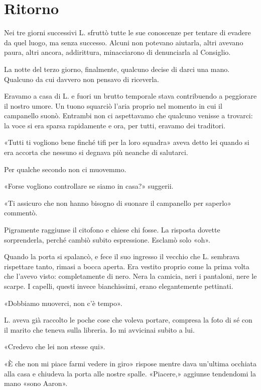 \chapter{Ritorno}
\label{ch:ritorno}

Nei tre giorni successivi L. sfruttò tutte le sue conoscenze per tentare di evadere da quel luogo,
ma senza successo. Alcuni non potevano aiutarla, altri avevano paura, altri ancora, addirittura,
minacciarono di denunciarla al Consiglio.

La notte del terzo giorno, finalmente, qualcuno decise di darci una mano. Qualcuno da cui davvero
non pensavo di riceverla.

Eravamo a casa di L. e fuori un brutto temporale stava contribuendo a peggiorare il nostro umore. Un
tuono squarciò l'aria proprio nel momento in cui il campanello suonò. Entrambi non ci aspettavamo
che qualcuno venisse a trovarci: la voce si era sparsa rapidamente e ora, per tutti, eravamo dei
traditori.

«Tutti ti vogliono bene finché tifi per la loro squadra» aveva detto lei quando si era accorta che
nessuno si degnava più neanche di salutarci.

Per qualche secondo non ci muovemmo.

«Forse vogliono controllare se siamo in casa?» suggerii.

«Ti assicuro che non hanno bisogno di suonare il campanello per saperlo» commentò.

Pigramente raggiunse il citofono e chiese chi fosse. La risposta dovette sorprenderla, perché cambiò
subito espressione. Esclamò solo «oh».

Quando la porta si spalancò, e fece il suo ingresso il vecchio che L. sembrava rispettare tanto,
rimasi a bocca aperta. Era vestito proprio come la prima volta che l'avevo visto: completamente di
nero. Nera la camicia, neri i pantaloni, nere le scarpe. I capelli, questi invece bianchissimi,
erano elegantemente pettinati.

«Dobbiamo muoverci, non c'è tempo».

L. aveva già raccolto le poche cose che voleva portare, compresa la foto di sé con il marito che
teneva sulla libreria. Io mi avvicinai subito a lui.

«Credevo che lei non stesse qui».

«È che non mi piace farmi vedere in giro» rispose mentre dava un'ultima occhiata alla casa e
chiudeva la porta alle nostre spalle. «Piacere,» aggiunse tendendomi la mano «sono Aaron».

